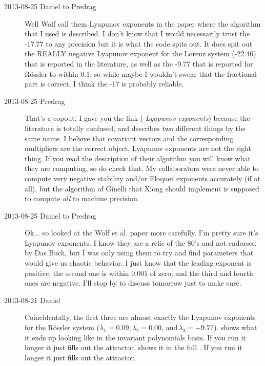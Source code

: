\begin{description}
\item[2013-08-25 Daniel to Predrag]             \toCB
Well Wolf \etal{} call them Lyapunov exponents in the
paper where the algorithm that I used is described. I don't know that
I would necessarily trust the -17.77 to any precision but it is what
the code spits out. It does spit out the REALLY negative Lyapunov
exponent for the Lorenz system (-22.46) that is reported in the
literature, as well as the -9.77
that is reported for R\"ossler to within 0.1, so while maybe I
wouldn't swear that the fractional part is correct, I think the -17
is probably reliable.

\item[2013-08-25 Predrag]
That's a copout. I gave you the link
(
{\emph{Lyapunov}} \emph{exponents}) because the literature is totally
confused, and describes two different things by the same name. I
believe that covariant vectors and the corresponding multipliers are
the correct object, Lyapunov exponents are not the right thing. If
you read the description of their algorithm you will know what they
are computing, so do check that. My collaborators were never able to
compute very negative stability and/or Floquet exponents accurately
(if at all), but the algorithm of Ginelli \etal{} that
Xiong should implement is supposed to compute \emph{all} to machine
precision.

\item[2013-08-25 Daniel to Predrag]Ok... so looked at the Wolf et al. paper more carefully. I'm
pretty sure it's Lyapunov exponents. I know they are a relic of the 80's and
not endorsed by Das Buch, but I was only using them to try and find
parameters that would give us chaotic behavior. I just know that the leading exponent is positive, the
second one is within 0.001 of zero, and the third and fourth ones are negative. I'll
stop by to discuss tomorrow just to make sure.

\item[2013-08-21 Daniel]
Coincidentally, the first three are almost exactly the Lyapunov
exponents for the R\"ossler system ($\lambda_1=0.09,
\lambda_2=0.00,\, \mathrm{and}\, \lambda_3=-9.77$).
 shows what it ends up looking like in the
invariant polynomials basis. If you run it longer it just fills out
the attractor.  shows it in the full
\statesp. If you run it longer it just fills out the attractor.


\end{description}
